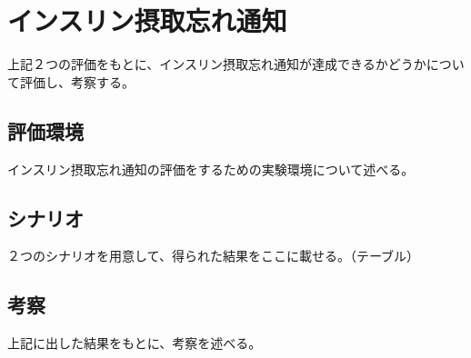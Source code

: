 \section{インスリン摂取忘れ通知}
上記２つの評価をもとに、インスリン摂取忘れ通知が達成できるかどうかについて評価し、考察する。

\subsection{評価環境}
インスリン摂取忘れ通知の評価をするための実験環境について述べる。

\subsection{シナリオ}
２つのシナリオを用意して、得られた結果をここに載せる。（テーブル）


\subsection{考察}

上記に出した結果をもとに、考察を述べる。

